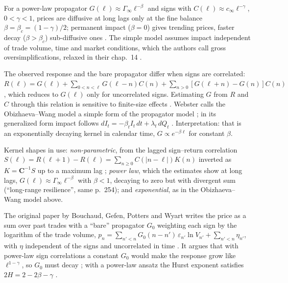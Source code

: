 \begin{qfmodel}
For a power-law propagator $G(\ell)\approx\Gamma_\infty\ell^{-\beta}$ and signs with $C(\ell)\approx c_\infty\ell^{-\gamma}$, $0<\gamma<1$, prices are diffusive at long lags only at the fine balance $\beta=\beta_c=(1-\gamma)/2$; permanent impact ($\beta=0$) gives trending prices, faster decay ($\beta>\beta_c$) sub-diffusive ones \citep[chap.~13, secs.~13.2.2--13.2.3, eq.~(13.17), pp.~256--257]{catalogue-0528}. The simple model assumes impact independent of trade volume, time and market conditions, which the authors call gross oversimplifications, relaxed in their chap.~14 \citep[same chap., p.~252]{catalogue-0528}.

 The observed response and the bare propagator differ when signs are correlated: $R(\ell)=G(\ell)+\sum_{0<n<\ell}G(\ell-n)C(n)+\sum_{n>0}[G(\ell+n)-G(n)]C(n)$, which reduces to $G(\ell)$ only for uncorrelated signs. Estimating $G$ from $R$ and $C$ through this relation is sensitive to finite-size effects \citep[same chap., sec.~13.2.1, eq.~(13.10), p.~253]{catalogue-0528}. Webster calls the Obizhaeva--Wang model a simple form of the propagator model \citep[chap.~1, p.~10]{wide-webster-price-impact}; in its generalized form impact follows $dI_t=-\beta_tI_t\,dt+\lambda_t\,dQ_t$ \citep[chap.~2, Definition~2.8.1, p.~97]{wide-webster-price-impact}. Interpretation: that is an exponentially decaying kernel in calendar time, $G\propto e^{-\beta\ell}$ for constant $\beta$.

Kernel shapes in use: \emph{non-parametric}, from the lagged sign--return correlation $S(\ell)=R(\ell+1)-R(\ell)=\sum_{n\ge0}C(|n-\ell|)K(n)$ inverted as $K=\mathbf C^{-1}S$ up to a maximum lag \citep[chap.~13, eqs.~(13.13)--(13.15), p.~254]{catalogue-0528}; \emph{power law}, which the estimates show at long lags, $G(\ell)\approx\Gamma_\infty\ell^{-\beta}$ with $\beta<1$, decaying to zero but with divergent sum (``long-range resilience'', same p.~254); and \emph{exponential}, as in the Obizhaeva--Wang model above.

The original paper by Bouchaud, Gefen, Potters and Wyart writes the price as a sum over past trades with a ``bare'' propagator $G_0$ weighting each sign by the logarithm of the trade volume, $p_n=\sum_{n'<n}G_0(n-n')\,\varepsilon_{n'}\ln V_{n'}+\sum_{n'<n}\eta_{n'}$, with $\eta$ independent of the signs and uncorrelated in time \citep[arXiv cond-mat/0307332v2, sec.~3.1, eq.~(12), p.~14]{wide-bouchaud-propagator}. It argues that with power-law sign correlations a constant $G_0$ would make the response grow like $\ell^{1-\gamma}$, so $G_0$ must decay \citep[same, sec.~3.1, p.~16]{wide-bouchaud-propagator}; with a power-law ansatz the Hurst exponent satisfies $2H=2-2\beta-\gamma$ \citep[same, sec.~3.2, eq.~(22), pp.~16--17]{wide-bouchaud-propagator}.


\end{qfmodel}
